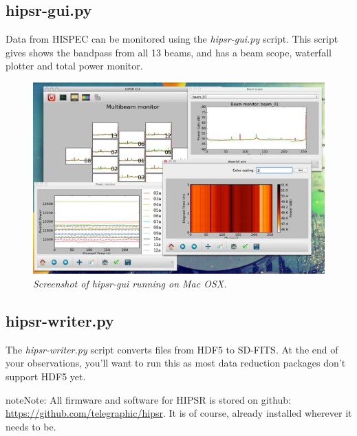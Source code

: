 \documentclass[letterpaper,10pt,english]{sphinxmanual}
\begin{document}
\subsection{hipsr-gui.py}
\label{overview:hipsr-gui-py}
Data from HISPEC can be monitored using the \emph{hipsr-gui.py} script. This script gives shows the
bandpass from all 13 beams, and has a beam scope, waterfall plotter and total power monitor.
\begin{figure}[htbp]
\centering
\capstart

\includegraphics{hipsr-gui.jpg}
\caption{\emph{Screenshot of hipsr-gui running on Mac OSX.}}\end{figure}


\subsection{hipsr-writer.py}
\label{overview:hipsr-writer-py}
The \emph{hipsr-writer.py} script converts files from HDF5 to SD-FITS. At the end of your observations, you'll want to run this as most data reduction packages don't support HDF5 yet.

\begin{notice}{note}{Note:}
All firmware and software for HIPSR is stored on github: \href{https://github.com/telegraphic/hipsr}{https://github.com/telegraphic/hipsr}.
It is of course, already installed wherever it needs to be.
\end{notice}
\end{document}
